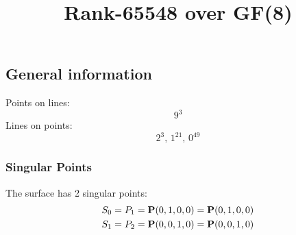 \documentclass{article}
\newcommand\setTBstruts{\def\T{\rule{0pt}{2.6ex}}%
\def\B{\rule[-1.2ex]{0pt}{0pt}}}
\newcommand{\bP}{{\bf P}}
\begin{document}
 
\setTBstruts



{\allowdisplaybreaks%






\title{Rank-65548 over GF(8)}
\author{}%
\maketitle%
%
{}



\subsection*{General information}
Points on lines:
$$
9^3$$
Lines on points:
$$
2^3,\,1^{21},\,0^{49}$$
\subsubsection*{Singular Points}
The surface has 2 singular points:\\
\begin{align*}
S_{0} &= P_{1}=\bP(0, 1, 0, 0) = \bP(0, 1, 0, 0)\\
S_{1} &= P_{2}=\bP(0, 0, 1, 0) = \bP(0, 0, 1, 0)\\
\end{align*}
}
\end{document}
